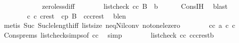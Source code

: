 \begin{isabellebody}
\ \ \ \ \ \ \ \ \ \ \ \ zero{\isacharunderscore}{\kern0pt}less{\isacharunderscore}{\kern0pt}diff{\isacharparenright}{\kern0pt}\isanewline
\ \ \ \ \ \ \isamarkupfalse%
\ {}{\isacharcolon}{\kern0pt}{\isachardoublequoteopen}list{\isacharunderscore}{\kern0pt}check\ cc\ {\isacharparenleft}{\kern0pt}B\ {\isacharat}{\kern0pt}\ {\isacharbrackleft}{\kern0pt}b{\isacharbrackright}{\kern0pt}{\isacharparenright}{\kern0pt}{\isachardoublequoteclose}\ \isamarkupfalse%
\ {}\ {}\ {}\ \ Cons{\isachardot}{\kern0pt}IH\ \isamarkupfalse%
\ blast\isanewline
\ \ \ \ \ \ \isamarkupfalse%
\ c{}\ c{}\ crest\ \ cp{\isacharcolon}{\kern0pt}\ {\isachardoublequoteopen}B\ {\isacharequal}{\kern0pt}\ c{}{\isacharhash}{\kern0pt}c{}{\isacharhash}{\kern0pt}crest{\isachardoublequoteclose}\ \isamarkupfalse%
\ blen\isanewline
\ \ \ \ \ \ \isamarkupfalse%
\ {\isacharparenleft}{\kern0pt}metis\ Suc{\isacharunderscore}{\kern0pt}{}\ Suc{\isacharunderscore}{\kern0pt}le{\isacharunderscore}{\kern0pt}length{\isacharunderscore}{\kern0pt}iff\ list{\isachardot}{\kern0pt}size{\isacharparenleft}{\kern0pt}{}{\isacharparenright}{\kern0pt}\ neq{\isacharunderscore}{\kern0pt}Nil{\isacharunderscore}{\kern0pt}conv\ not{\isacharunderscore}{\kern0pt}one{\isacharunderscore}{\kern0pt}le{\isacharunderscore}{\kern0pt}zero{\isacharparenright}{\kern0pt}\isanewline
\ \ \ \ \ \ \isamarkupfalse%
\ {}{\isacharcolon}{\kern0pt}{\isachardoublequoteopen}cc\ a\ c{}\ c{}{\isachardoublequoteclose}\ \isamarkupfalse%
\ Cons{\isachardot}{\kern0pt}prems{\isacharparenleft}{\kern0pt}{}{\isacharparenright}{\kern0pt}\ list{\isacharunderscore}{\kern0pt}check{\isachardot}{\kern0pt}simps{\isacharparenleft}{\kern0pt}{}{\isacharparenright}{\kern0pt}{\isacharbrackleft}{\kern0pt}of\ {\isachardoublequoteopen}cc{\isachardoublequoteclose}{\isacharbrackright}{\kern0pt}\ \isamarkupfalse%
\ simp\isanewline
\ \ \ \ \ \ \isamarkupfalse%
\ {\isachardoublequoteopen}list{\isacharunderscore}{\kern0pt}check\ cc\ {\isacharparenleft}{\kern0pt}c{}{\isacharhash}{\kern0pt}c{}{\isacharhash}{\kern0pt}crest{\isacharat}{\kern0pt}{\isacharbrackleft}{\kern0pt}b{\isacharbrackright}{\kern0pt}{\isacharparenright}{\kern0pt}{\isachardoublequoteclose}\ \isamarkupfalse%

\end{isabellebody}
